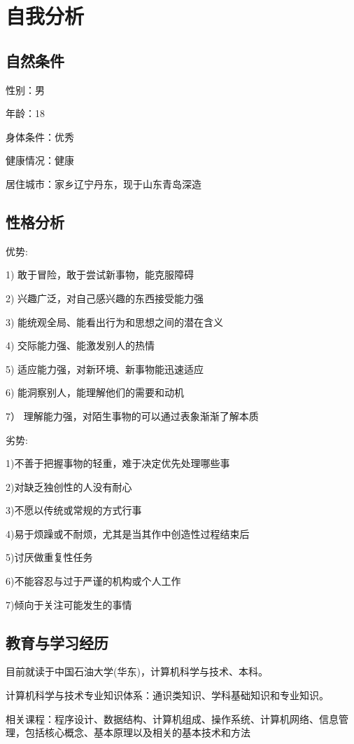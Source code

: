 \documentclass{article}
\begin{document}
\section{自我分析}
\par
\subsection{自然条件}
性别：男\par
年龄：18\par
身体条件：优秀\par
健康情况：健康\par
居住城市：家乡辽宁丹东，现于山东青岛深造\par
\subsection{性格分析}
优势:\par
	 1)  敢于冒险，敢于尝试新事物，能克服障碍\par
     2)	 兴趣广泛，对自己感兴趣的东西接受能力强\par
     3)	能统观全局、能看出行为和思想之间的潜在含义\par
     4)	交际能力强、能激发别人的热情\par
     5)	适应能力强，对新环境、新事物能迅速适应\par
     6)	能洞察别人，能理解他们的需要和动机\par
     7）  理解能力强，对陌生事物的可以通过表象渐渐了解本质\par
劣势:\par
	 1)不善于把握事物的轻重，难于决定优先处理哪些事\par
     2)对缺乏独创性的人没有耐心\par
     3)不愿以传统或常规的方式行事\par
     4)易于烦躁或不耐烦，尤其是当其作中创造性过程结束后\par
     5)讨厌做重复性任务\par
     6)不能容忍与过于严谨的机构或个人工作\par
	 7)倾向于关注可能发生的事情\par
\subsection{教育与学习经历}
目前就读于中国石油大学(华东)，计算机科学与技术、本科。\par
计算机科学与技术专业知识体系：通识类知识、学科基础知识和专业知识。\par
相关课程：程序设计、数据结构、计算机组成、操作系统、计算机网络、信息管理，包括核心概念、基本原理以及相关的基本技术和方法\par
\end{document}
